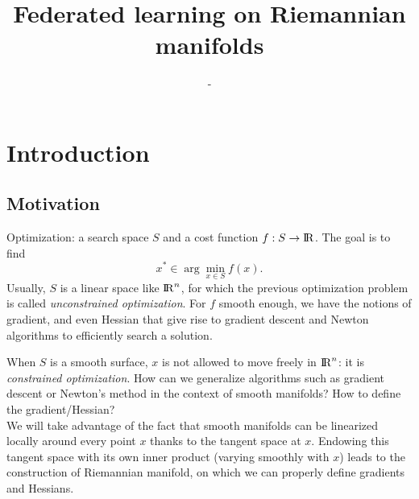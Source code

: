 \documentclass[10pt,a4paper]{book}
\author{-}
\title{Federated learning on Riemannian manifolds} %
\theoremstyle{definition}
\theoremstyle{plain}
\theoremstyle{remark}
\def\R{{\rm I\kern-0.16em R}}
\begin{document}
\maketitle
\tableofcontents



\chapter{Introduction}
\section*{Motivation}
Optimization: a search space $S$ and a cost function $f:S\to \R$. The goal is to find 
$$x^{\ast}\in \arg \min_{x\in S}f(x).$$
Usually, $S$ is a linear space like $\R^n$, for which the previous optimization problem is called \emph{unconstrained optimization}. For $f$ smooth enough, we have the notions of gradient, and even Hessian that give rise to gradient descent and Newton algorithms to efficiently search a solution. 
\par \medskip
When $S$ is a smooth surface, $x$ is not allowed to move freely in $\R^n$: it is \emph{constrained optimization}.  How can we generalize algorithms such as gradient descent or Newton's method in the context of smooth manifolds? How to define the gradient/Hessian?\\ We will take advantage of the fact that smooth manifolds can be linearized locally around every point $x$ thanks to the tangent space at $x$. Endowing this tangent space with its own inner product (varying smoothly with $x$) leads to the construction of Riemannian manifold, on which we can properly define gradients and Hessians. 
\end{document}
